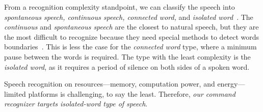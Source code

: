 From a recognition complexity standpoint, we can classify the speech into \textit{spontaneous speech, continuous speech, connected word,} and \textit{isolated word}~\cite{gaikwad2010review}.
The \textit{continuous} and \textit{spontaneous speech} are the closest to natural speech, but they are the most difficult to recognize because they need special methods to detect words boundaries~\cite{gaikwad2010review}. This is less the case for the \textit{connected word} type, where a minimum pause between the words is required. The type with the least complexity is the \textit{isolated word}, as it requires a period of silence on both sides of a spoken word. 
 
Speech recognition on resources---memory, computation power, and energy---limited platforms is challenging, to say the least. Therefore, \emph{our command recognizer targets isolated-word type of speech}. 



















